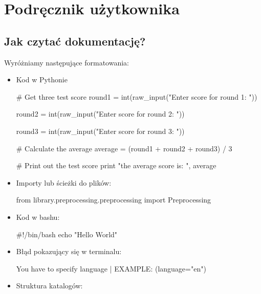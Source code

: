 \newpage
\section{Podręcznik użytkownika}
\subsection{Jak czytać dokumentację?}

Wyróżniamy następujące formatowania:

\begin{itemize}
\item Kod w Pythonie

\begin{python}
# Get three test score
round1 = int(raw_input("Enter score for round 1: "))

round2 = int(raw_input("Enter score for round 2: "))

round3 = int(raw_input("Enter score for round 3: "))
   
# Calculate the average
average = (round1 + round2 + round3) / 3

# Print out the test score
print "the average score is: ", average 

\end{python}
 
\item Importy lub ścieżki do plików:
\begin{import}
from library.preprocessing.preprocessing import Preprocessing
\end{import}

\item Kod w bashu:

\begin{bash}
#!/bin/bash
echo "Hello World"
\end{bash}

\item Błąd pokazujący się w terminalu:
\begin{consolerror}
You have to specify language | EXAMPLE: (language="en")
\end{consolerror}



\item Struktura katalogów:
\myspace
{}

\end{itemize}